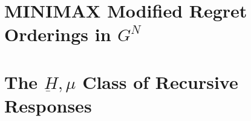 \documentclass[11pt]{article}
\numberwithin{equation}{section}
\theoremstyle{boldStyle}
\begin{document}
\newpage
\section{MINIMAX Modified Regret Orderings in $G^N$}





\newpage
\section{The $\underbar{H}, \mu$ Class of Recursive Responses}
\end{document}
